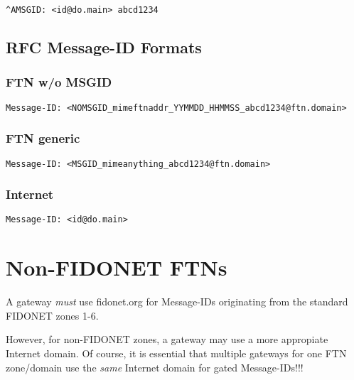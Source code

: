 \documentclass[letterpaper]{article}
\begin{document}
\begin{verbatim}
^AMSGID: <id@do.main> abcd1234 
\end{verbatim}



\subsection{RFC Message-ID Formats }




\subsubsection{FTN w/o MSGID }

\begin{verbatim}
Message-ID: <NOMSGID_mimeftnaddr_YYMMDD_HHMMSS_abcd1234@ftn.domain> 
\end{verbatim}



\subsubsection{FTN generic }

\begin{verbatim}
Message-ID: <MSGID_mimeanything_abcd1234@ftn.domain> 
\end{verbatim}



\subsubsection{Internet }

\begin{verbatim}
Message-ID: <id@do.main> 
\end{verbatim}



\section{Non-FIDONET FTNs}



A gateway {\itshape must\/} use {\ttfamily fidonet.org} for Message-IDs originating from the standard FIDONET zones 1-6.

However, for non-FIDONET zones, a gateway may use a more appropiate Internet domain. Of course, it is essential that multiple gateways for one FTN zone/domain use the {\itshape same\/} Internet domain for gated Message-IDs!!! 
\end{document}
